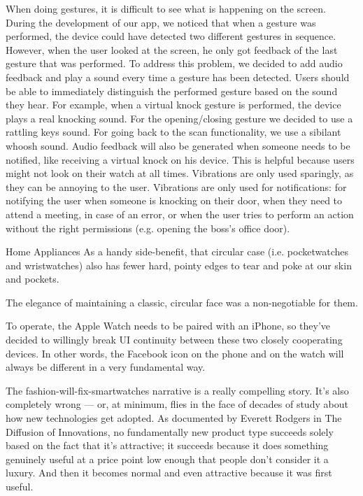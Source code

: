 \documentclass{article}
\begin{document}
When doing gestures, it is difficult to see what is
happening on the screen. During the development of
our app, we noticed that when a gesture was
performed, the device could have detected two different
gestures in sequence. However, when the user looked
at the screen, he only got feedback of the last gesture
that was performed. To address this problem, we
decided to add audio feedback and play a sound every
time a gesture has been detected. Users should be able
to immediately distinguish the performed gesture based
on the sound they hear. For example, when a virtual
knock gesture is performed, the device plays a real
knocking sound. For the opening/closing gesture we
decided to use a rattling keys sound. For going back to
the scan functionality, we use a sibilant whoosh sound.
Audio feedback will also be generated when someone
needs to be notified, like receiving a virtual knock on
his device. This is helpful because users might not look
on their watch at all times. Vibrations are only used
sparingly, as they can be annoying to the user.
Vibrations are only used for notifications: for notifying
the user when someone is knocking on their door, when
they need to attend a meeting, in case of an error, or
when the user tries to perform an action without the
right permissions (e.g. opening the boss’s office door). 

Home Appliances 
As a handy side-benefit, that circular case (i.e. pocketwatches and wristwatches) also has fewer hard, pointy edges to tear and poke at our skin and pockets.

The elegance of maintaining a classic, circular face was a non-negotiable for them. 

To operate, the Apple Watch needs to be paired with an iPhone, so they’ve decided to willingly break UI continuity between these two closely cooperating devices. In other words, the Facebook icon on the phone and on the watch will always be different in a very fundamental way.

The fashion-will-fix-smartwatches narrative is a really compelling story. It’s also completely wrong — or, at minimum, flies in the face of decades of study about how new technologies get adopted. As documented by Everett Rodgers in The Diffusion of Innovations, no fundamentally new product type succeeds solely based on the fact that it’s attractive; it succeeds because it does something genuinely useful at a price point low enough that people don’t consider it a luxury. And then it becomes normal and even attractive because it was first useful.
\end{document}
